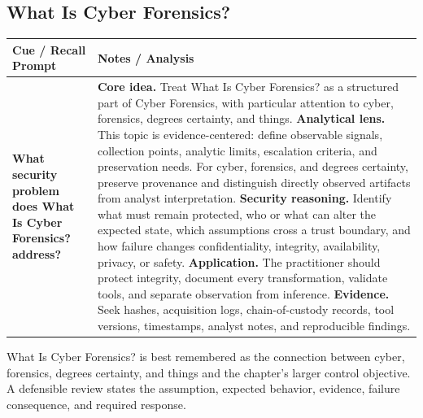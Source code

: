 \documentclass[11pt]{article}
\newcommand{\CornellHeader}{%
\rowcolor{Navy}\color{white}\bfseries Cue / Recall Prompt & \color{white}\bfseries Notes / Analysis\\\hline}
\newcommand{\CornellRow}[2]{%
\cellcolor{CueGray}\RaggedRight\textbf{#1} & \RaggedRight #2\\\hline}
\begin{document}
\subsection*{What Is Cyber Forensics?}
\begin{longtable}{>{\RaggedRight\arraybackslash}p{}|>{\RaggedRight\arraybackslash}p{}}
\CornellHeader
\CornellRow{What security problem does What Is Cyber Forensics? address?}{\textbf{Core idea.} Treat What Is Cyber Forensics? as a structured part of Cyber Forensics, with particular attention to cyber, forensics, degrees certainty, and things. \textbf{Analytical lens.} This topic is evidence-centered: define observable signals, collection points, analytic limits, escalation criteria, and preservation needs. For cyber, forensics, and degrees certainty, preserve provenance and distinguish directly observed artifacts from analyst interpretation. \textbf{Security reasoning.} Identify what must remain protected, who or what can alter the expected state, which assumptions cross a trust boundary, and how failure changes confidentiality, integrity, availability, privacy, or safety. \textbf{Application.} The practitioner should protect integrity, document every transformation, validate tools, and separate observation from inference. \textbf{Evidence.} Seek hashes, acquisition logs, chain-of-custody records, tool versions, timestamps, analyst notes, and reproducible findings.}
\end{longtable}
\begin{topicsummary}
What Is Cyber Forensics? is best remembered as the connection between cyber, forensics, degrees certainty, and things and the chapter's larger control objective. A defensible review states the assumption, expected behavior, evidence, failure consequence, and required response.
\end{topicsummary}
\end{document}
